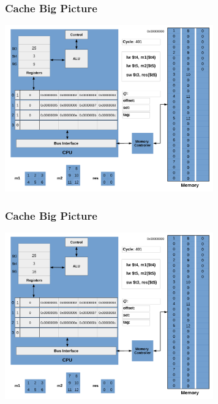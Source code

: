 \documentclass{beamer}
\begin{document}
\begin{frame}[fragile]
\frametitle{Cache Big Picture}

\begin{center}
\vspace*{-0.23cm}
\hspace*{-1cm}\includegraphics[width=9cm]{cache31.pdf}
\end{center}

\end{frame}

\begin{frame}[fragile]
\frametitle{Cache Big Picture}

\begin{center}
\vspace*{-0.23cm}
\hspace*{-1cm}\includegraphics[width=9cm]{cache32.pdf}
\end{center}

\end{frame}
\end{document}
